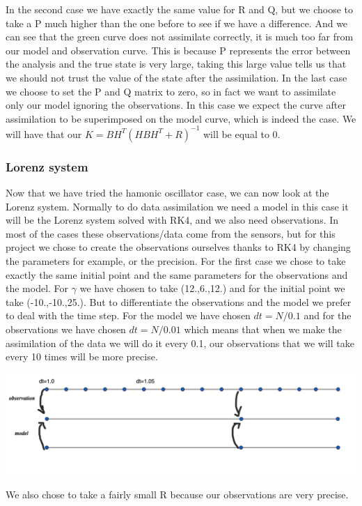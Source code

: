 In the second case we have exactly the same value for R and Q, but we choose to take a P much higher than the one before to see if we have a difference. And we can see that the green curve does not assimilate correctly, it is much too far from our model and observation curve. This is because P represents the error between the analysis and the true state is very large, taking this large value tells us that we should not trust the value of the state after the assimilation.
In the last case we choose to set the P and Q matrix to zero, so in fact we want to assimilate only our model ignoring the observations. In this case we expect the curve after assimilation to be superimposed on the model curve, which is indeed the case. We will have that our $K=BH^T(HBH^T+R)^{-1}$ will be equal to 0.
\subsubsection{Lorenz system}
Now that we have tried the hamonic oscillator case, we can now look at the Lorenz system. Normally to do data assimilation we need a model in this case it will be the Lorenz system solved with RK4, and we also need observations. In most of the cases these observations/data come from the sensors, but for this project we chose to create the observations ourselves thanks to RK4 by changing the parameters for example, or the precision. 
For the first case we chose to take exactly the same initial point and the same parameters for the observations and the model.
For $\gamma$ we have chosen to take (12.,6.,12.) and for the initial point we take (-10.,-10.,25.). But to differentiate the observations and the model we prefer to deal with the time step. For the model we have chosen $dt=N/0.1$ and for the observations we have chosen $dt=N/0.01$ which means that when we make the assimilation of the data we will do it every 0.1, our observations that we will take every 10 times will be more precise.
\begin{center}
		\includegraphics[width=1\textwidth]{"images/dt.png"}
\end{center}
We also chose to take a fairly small R because our observations are very precise.
